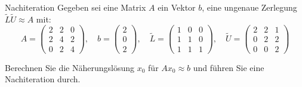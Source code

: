 \begin{example}{Nachiteration}
    Gegeben sei eine Matrix $A$ ein Vektor $b$, eine ungenaue Zerlegung $\tilde{L} \tilde{U} \approx A$ mit:
    \[
        A = \begin{pmatrix}
            2 & 2 & 0 \\
            2 & 4 & 2 \\
            0 & 2 & 4
        \end{pmatrix}
        , \quad
        b = \begin{pmatrix}
            2 \\
            0 \\
            2
        \end{pmatrix}
        , \quad
        \tilde{L} = \begin{pmatrix}
            1 & 0 & 0 \\
            1 & 1 & 0 \\
            1 & 1 & 1
        \end{pmatrix}
        , \quad
        \tilde{U} = \begin{pmatrix}
            2 & 2 & 1 \\
            0 & 2 & 2 \\
            0 & 0 & 2
        \end{pmatrix}
    \]

    Berechnen Sie die Näherungslösung $x_0$ für $A x_0 \approx b$ und führen Sie eine Nachiteration durch.

    \exampleseparator

    \footnotesize


\end{example}
